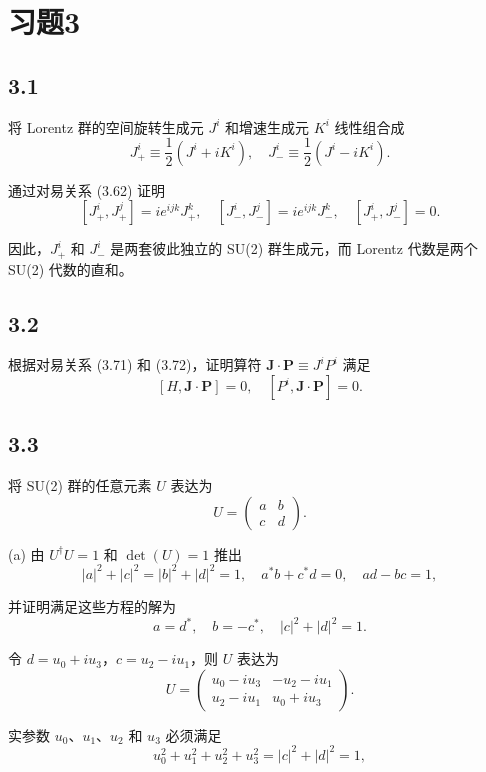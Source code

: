 \section{习题3}


\newpage
\subsection{3.1}
将 Lorentz 群的空间旋转生成元 $J^i$ 和增速生成元 $K^i$ 线性组合成
$$ J_+^i \equiv \frac{1}{2}(J^i + iK^i), \quad J_-^i \equiv \frac{1}{2}(J^i - iK^i). \tag{3.208} $$

通过对易关系 (3.62) 证明
$$ [J_+^i, J_+^j] = i e^{ijk} J_+^k, \quad [J_-^i, J_-^j] = i e^{ijk} J_-^k, \quad [J_+^i, J_-^j] = 0. \tag{3.209} $$

因此，$J_+^i$ 和 $J_-^i$ 是两套彼此独立的 SU(2) 群生成元，而 Lorentz 代数是两个 SU(2) 代数的直和。

\newpage
\subsection{3.2}
根据对易关系 (3.71) 和 (3.72)，证明算符 $\mathbf{J} \cdot \mathbf{P} \equiv J^i P^i$ 满足
$$ [H, \mathbf{J} \cdot \mathbf{P}] = 0, \quad [P^i, \mathbf{J} \cdot \mathbf{P}] = 0. \tag{3.210} $$

\newpage
\subsection{3.3}
将 SU(2) 群的任意元素 $U$ 表达为
$$ U = \begin{pmatrix} a & b \\ c & d \end{pmatrix}. \tag{3.211} $$

(a) 由 $U^\dagger U = 1$ 和 $\det(U) = 1$ 推出
$$ |a|^2 + |c|^2 = |b|^2 + |d|^2 = 1, \quad a^* b + c^* d = 0, \quad ad - bc = 1, \tag{3.212} $$

并证明满足这些方程的解为
$$ a = d^*, \quad b = -c^*, \quad |c|^2 + |d|^2 = 1. \tag{3.213} $$

令 $ d = u_0 + iu_3 $，$ c = u_2 - iu_1 $，则 $ U $ 表达为
$$ U = \begin{pmatrix} u_0 - iu_3 & -u_2 - iu_1 \\ u_2 - iu_1 & u_0 + iu_3 \end{pmatrix}. \tag{3.214} $$

实参数 $ u_0 $、$ u_1 $、$ u_2 $ 和 $ u_3 $ 必须满足
$$ u_0^2 + u_1^2 + u_2^2 + u_3^2 = |c|^2 + |d|^2 = 1, \tag{3.215} $$

